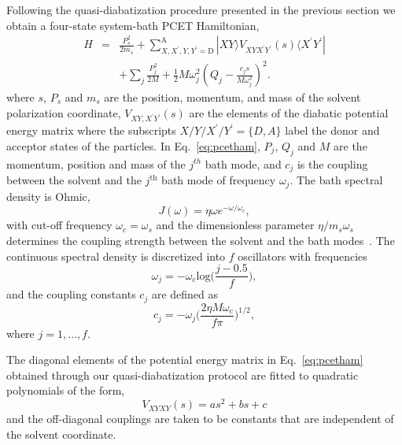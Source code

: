 \documentclass[phd,tocprelim]{cornell}
\begin{document}
Following the quasi-diabatization procedure 
presented in the previous section we 
obtain a four-state system-bath PCET Hamiltonian,
\begin{eqnarray}
\label{eq:pcetham}
\nonumber
H&=&\frac{P_{s}^2}{2m_{s}} +
\sum_{X,X^\prime,Y,Y^\prime=\textrm{D}}^\textrm{A}
|XY \rangle V_{XYX^\prime Y^\prime}(s) \langle X^\prime Y^\prime|
\\
&&+\sum_{j} \frac{P_{j}^2}{2M} + 
\frac{1}{2} M\omega_{j}^{2} (Q_{j} - 
\frac{c_js}{M\omega_{j}^2})^{2}.
\end{eqnarray}
where $s$, $P_s$ and $m_s$ are the position, momentum,
and mass of the solvent polarization coordinate,
$V_{XY,X^\prime Y^\prime}(s)$ are the elements of the diabatic potential 
energy matrix where the subscripts $X/Y/X^\prime/Y^\prime=\{D,A\}$ label
the donor and acceptor states of the particles.
In Eq.~\ref{eq:pcetham}, $P_j$, $Q_j$ and $M$ are the momentum, position and mass of the $j^{th}$ bath mode,
and $c_j$ is the coupling between the solvent and 
the $j^\textrm{th}$ bath mode of frequency $\omega_j$.
The bath spectral density is Ohmic,
\begin{equation}
\label{eq:specden}
J(\omega) = \eta \omega e^{-\omega/\omega_\textrm{c}},
\end{equation}
with cut-off frequency $\omega_c=\omega_s$ 
and the dimensionless parameter $\eta/m_s\omega_s$ 
determines the coupling strength between the solvent 
and the bath modes~\cite{ACAL1983}.
The continuous spectral density is discretized into
$f$ oscillators with frequencies~\cite{ICDM2005}
\begin{equation}
\label{eq:omegaj}
\omega_j = -\omega_\textrm{c}\textrm{log} 
\bigg( \frac{ j- 0.5}{f} \bigg),
\end{equation}
and the coupling constants $c_j$ are defined as
\begin{equation}
\label{eq:bathcoup}
c_j = -\omega_j \bigg( \frac{2 \eta M \omega_\textrm{c}}{f \pi} \bigg)^{1/2},
\end{equation}
where $j=1, \dots ,f$.

The diagonal elements of the potential
energy matrix in Eq.~\ref{eq:pcetham} obtained through
our quasi-diabatization protocol are fitted to quadratic
polynomials of the form,
\begin{equation}
\label{eq:diabats}
V_{XYXY}(s)= a s^2+b s+c
\end{equation}
and the off-diagonal couplings are taken to be constants that
are independent of the solvent coordinate.
\end{document}
